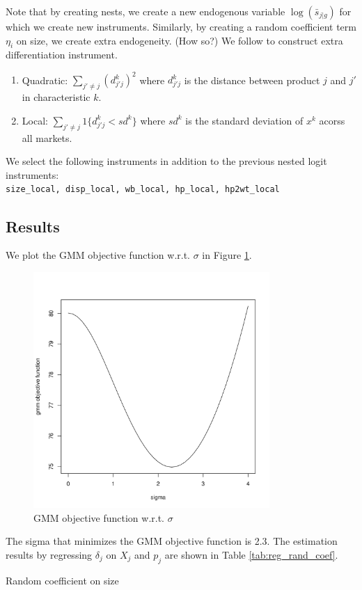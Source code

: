 \documentclass[12pt]{article}
\begin{document}
Note that by creating nests, we create a new endogenous variable
$\log(\bar{s}_{j|g})$ for which we create new instruments. Similarly, by
creating a random coefficient term $\eta_i$ on size, we create extra
endogeneity. (How so?) We follow \citet{gandhihoude2019measuring} to construct
extra differentiation instrument.
\begin{enumerate}
    \item Quadratic: $\sum_{j' \neq j} (d_{j'j}^k)^2$ where $d_{j'j}^k$ is the distance
          between product $j$ and $j'$ in characteristic $k$.
    \item Local: $\sum_{j' \neq j} 1\{d_{j'j}^k < sd^k\}$ where $sd^k$ is the standard
          deviation of $x^k$ acorss all markets.
\end{enumerate}
We select the following instruments in addition to the previous nested logit instruments:\\
\verb|size_local, disp_local, wb_local, hp_local, hp2wt_local|
\subsection{Results}
We plot the GMM objective function w.r.t. $\sigma$ in Figure
\ref{fig:iv_local_diff}.
\begin{figure}[h!]
    \centering
    \includegraphics[width=0.8\textwidth]{../Results/Figures/gmm_obj_iv_local.pdf}
    \caption{GMM objective function w.r.t. $\sigma$}
    \label{fig:iv_local_diff}
\end{figure}
The sigma that minimizes the GMM objective function is 2.3.
The estimation results by regressing $\delta_j$ on $X_j$ and $p_j$ are shown in Table \ref{tab:reg_rand_coef}.
\begin{table}[h!]\fontsize{10pt}{12pt}\selectfont
    \centering
    
    \caption{Random coefficient on size}
    \label{tab:reg_rand_coef}
\end{table}
\end{document}
